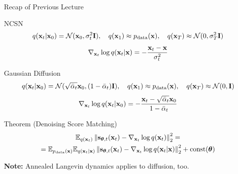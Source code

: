 \documentclass{beamer}
\begin{document}
\begin{frame}{Recap of Previous Lecture}
	\begin{block}{NCSN}
		\vspace{-0.7cm} 
		\[
			q(\mathbf{x}_t | \mathbf{x}_0) = \mathcal{N}(\mathbf{x}_0, \sigma_t^2 \mathbf{I}), \quad q(\mathbf{x}_1) \approx p_{\text{data}}(\mathbf{x}), \quad q(\mathbf{x}_T) \approx \mathcal{N}(0, \sigma_T^2 \mathbf{I})
		\]
		\[
			\nabla_{\mathbf{x}_t} \log q(\mathbf{x}_t | \mathbf{x}) = - \frac{\mathbf{x}_t - \mathbf{x}}{\sigma_t^2}
		\]
		\vspace{-0.6cm} 
	\end{block}
	\vspace{-0.2cm}
    \eqpause
	\begin{block}{Gaussian Diffusion}
		\vspace{-0.7cm} 
		\[
			q(\mathbf{x}_t | \mathbf{x}_0) = \mathcal{N}(\sqrt{\bar{\alpha}_t} \mathbf{x}_0, (1 - \bar{\alpha}_t) \mathbf{I}), \quad q(\mathbf{x}_1) \approx p_{\text{data}}(\mathbf{x}), \quad q(\mathbf{x}_T) \approx \mathcal{N}(0, \mathbf{I})
		\]
		\[
			\nabla_{\mathbf{x}_t} \log q(\mathbf{x}_t | \mathbf{x}_0) = - \frac{\mathbf{x}_t - \sqrt{\bar{\alpha}_t} \mathbf{x}_0}{1 - \bar{\alpha}_t}
		\]
		\vspace{-0.6cm} 
	\end{block}
	\vspace{-0.2cm}
    \eqpause
	\begin{block}{Theorem (Denoising Score Matching)}
		\vspace{-0.7cm}
		\begin{multline*}
			\mathbb{E}_{q(\mathbf{x}_t)}\left\| \mathbf{s}_{\boldsymbol{\theta}, t}(\mathbf{x}_t) - \nabla_{\mathbf{x}_t} \log q(\mathbf{x}_t) \right\|_2^2 = \\
			= \mathbb{E}_{p_{\text{data}}(\mathbf{x})} \mathbb{E}_{q(\mathbf{x}_t | \mathbf{x})}\left\| \mathbf{s}_{\boldsymbol{\theta}, t}(\mathbf{x}_t) - \nabla_{\mathbf{x}_t} \log q(\mathbf{x}_t | \mathbf{x}) \right\|_2^2 + \text{const}(\boldsymbol{\theta})
		\end{multline*}
		\vspace{-0.5cm}
	\end{block}
    \eqpause
	\vspace{-0.3cm}
	\textbf{Note:} Annealed Langevin dynamics applies to diffusion, too.
\end{frame}
\end{document}
